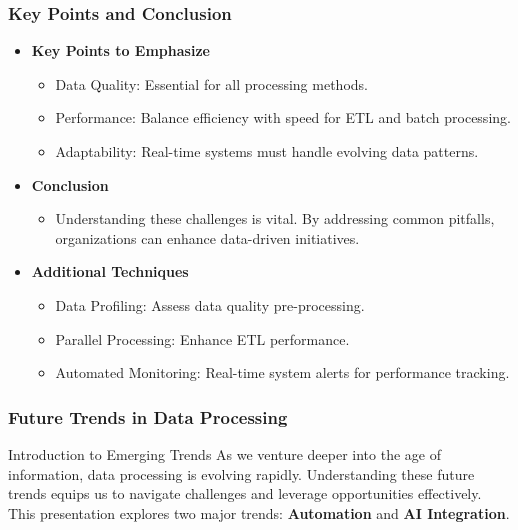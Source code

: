 \documentclass[aspectratio=169]{beamer}
\begin{document}
\begin{frame}[fragile]
  \frametitle{Key Points and Conclusion}
  \begin{itemize}
    \item \textbf{Key Points to Emphasize}
      \begin{itemize}
        \item Data Quality: Essential for all processing methods.
        \item Performance: Balance efficiency with speed for ETL and batch processing.
        \item Adaptability: Real-time systems must handle evolving data patterns.
      \end{itemize}
    \item \textbf{Conclusion}
      \begin{itemize}
        \item Understanding these challenges is vital. By addressing common pitfalls, organizations can enhance data-driven initiatives.
      \end{itemize}
    \item \textbf{Additional Techniques}
      \begin{itemize}
        \item Data Profiling: Assess data quality pre-processing.
        \item Parallel Processing: Enhance ETL performance.
        \item Automated Monitoring: Real-time system alerts for performance tracking.
      \end{itemize}
  \end{itemize}
\end{frame}

\begin{frame}[fragile]
    \frametitle{Future Trends in Data Processing}
    \begin{block}{Introduction to Emerging Trends}
    As we venture deeper into the age of information, data processing is evolving rapidly. 
    Understanding these future trends equips us to navigate challenges and leverage opportunities effectively. 
    This presentation explores two major trends: \textbf{Automation} and \textbf{AI Integration}.
    \end{block}
\end{frame}
\end{document}
